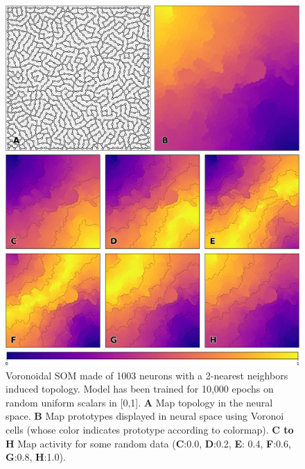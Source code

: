 \begin{figure}
  \includegraphics[width=\columnwidth]{figures/vsom-scalar-1.pdf}

  \vspace{2mm}
  
  \includegraphics[width=\columnwidth]{figures/vsom-scalar-2.pdf}

  \vspace{2mm}
  
  \includegraphics[width=\columnwidth]{figures/colormap.pdf}
  
  \caption{Voronoidal SOM made of 1003 neurons with a 2-nearest neighbors
    induced topology. Model has been trained for 10,000 epochs on random
    uniform scalars in [0,1]. \textbf{A} Map topology in the neural
    space. \textbf{B} Map prototypes displayed in neural space using Voronoi
    cells (whose color indicates prototype according to colormap). \textbf{C to
      H} Map activity for some random data (\textbf{C}:0.0, \textbf{D}:0.2,
    \textbf{E}: 0.4, \textbf{F}:0.6, \textbf{G}:0.8, \textbf{H}:1.0).}
\end{figure}

